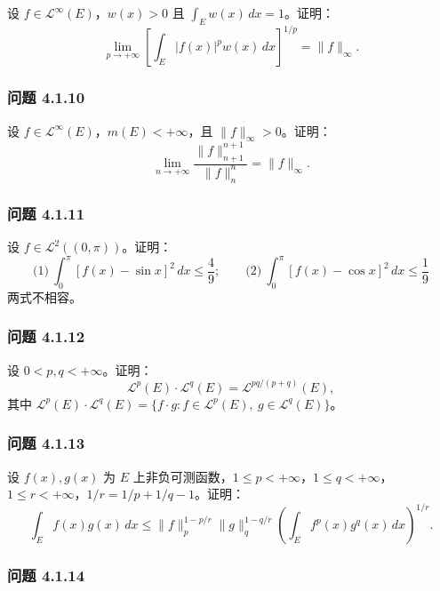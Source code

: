 \documentclass[11pt,a4paper]{article}
\begin{document}
设 \(f\in\mathcal L^\infty(E)\)，\(w(x)>0\) 且
\(\int_Ew(x)\,dx=1\)。证明： \[
\lim_{p\to+\infty}\left[\int_E|f(x)|^pw(x)\,dx\right]^{1/p}=\|f\|_\infty.
\]

\subsubsection{问题 4.1.10}\label{ch04-practice-ux95eeux9898-4.1.10}

设 \(f\in\mathcal L^\infty(E)\)，\(m(E)<+\infty\)，且
\(\|f\|_\infty>0\)。证明： \[
\lim_{n\to+\infty}\frac{\|f\|_{n+1}^{n+1}}{\|f\|_n^n}=\|f\|_\infty.
\]

\subsubsection{问题 4.1.11}\label{ch04-practice-ux95eeux9898-4.1.11}

设 \(f\in\mathcal L^2((0,\pi))\)。证明： \[
\text{(1)}\ \int_0^\pi[f(x)-\sin x]^2\,dx\le\frac49;\qquad
\text{(2)}\ \int_0^\pi[f(x)-\cos x]^2\,dx\le\frac19
\] 两式不相容。

\subsubsection{问题 4.1.12}\label{ch04-practice-ux95eeux9898-4.1.12}

设 \(0<p,q<+\infty\)。证明： \[
\mathcal L^p(E)\cdot\mathcal L^q(E)=\mathcal L^{pq/(p+q)}(E),
\] 其中
\(\mathcal L^p(E)\cdot\mathcal L^q(E)=\{f\cdot g:f\in\mathcal L^p(E),\ g\in\mathcal L^q(E)\}\)。

\subsubsection{问题 4.1.13}\label{ch04-practice-ux95eeux9898-4.1.13}

设 \(f(x),g(x)\) 为 \(E\)
上非负可测函数，\(1\le p<+\infty\)，\(1\le q<+\infty\)，\(1\le r<+\infty\)，\(1/r=1/p+1/q-1\)。证明：
\[
\int_Ef(x)g(x)\,dx\le
\|f\|_p^{1-p/r}\|g\|_q^{1-q/r}
\left(\int_Ef^p(x)g^q(x)\,dx\right)^{1/r}.
\]

\subsubsection{问题 4.1.14}\label{ch04-practice-ux95eeux9898-4.1.14}
\end{document}
